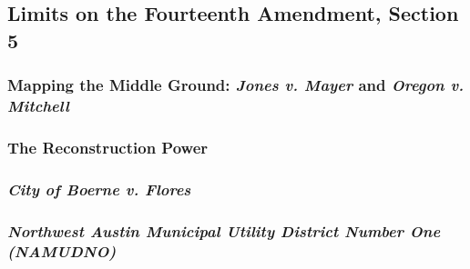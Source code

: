 \subsection{Limits on the Fourteenth Amendment, Section 5}

\subsubsection{Mapping the Middle Ground: \emph{Jones v. Mayer} and 
\emph{Oregon v. Mitchell}}

 
\subsubsection{The Reconstruction Power}
 
%
\subsubsection{\emph{City of Boerne v. Flores}}
 
 
\subsubsection{\emph{Northwest Austin Municipal Utility District Number One 
(NAMUDNO)}}

